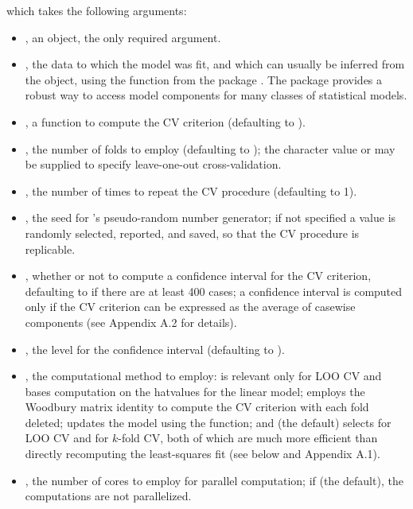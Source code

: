 \documentclass[
]{jss}
\begin{document}
which takes the following arguments:

\begin{itemize}
\item
  , an  object, the only required argument.
\item
  , the data to which the model was fit, and which can
  usually be inferred from the  object, using the
   function from the  package
  \citep{LudeckeWaggonerMakowski:2019}. The  package
  provides a robust way to access model components for many classes of
  statistical models.
\item
  , a function to compute the CV criterion (defaulting
  to ).
\item
  , the number of folds to employ (defaulting to ); the
  character value  or  may be supplied to specify
  leave-one-out cross-validation.
\item
  , the number of times to repeat the CV procedure
  (defaulting to 1).
\item
  , the seed for 's pseudo-random number
  generator; if not specified a value is randomly selected, reported,
  and saved, so that the CV procedure is replicable.
\item
  , whether or not to compute a confidence interval for
  the CV criterion, defaulting to  if there are at least 400
  cases; a confidence interval is computed only if the CV criterion can
  be expressed as the average of casewise components (see Appendix A.2
  for details).
\item
  , the level for the confidence interval (defaulting to
  ).
\item
  , the computational method to employ: 
  is relevant only for LOO CV and bases computation on the hatvalues for
  the linear model;  employs the Woodbury matrix
  identity to compute the CV criterion with each fold deleted;
   updates the model using the  function;
  and  (the default) selects  for LOO CV
  and  for \(k\)-fold CV, both of which are much more
  efficient than directly recomputing the least-squares fit (see below
  and Appendix A.1).
\item
  , the number of cores to employ for parallel computation;
  if  (the default), the computations are not
  parallelized.
\end{itemize}
\end{document}
